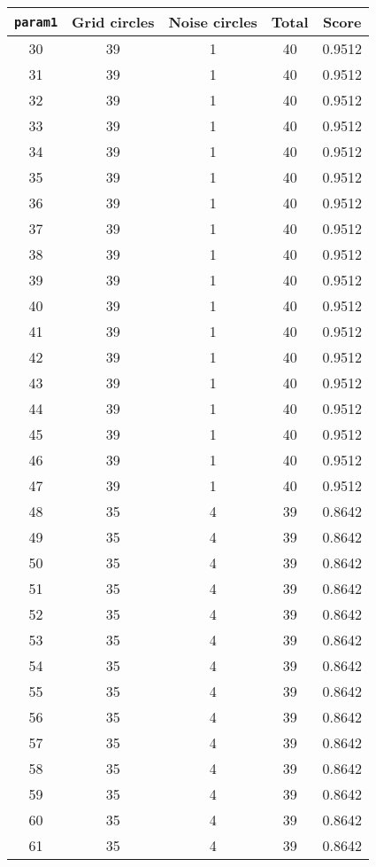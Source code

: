 \documentclass[letterpaper, 12pt]{article}
\begin{document}
\begin{longtable}{|c|c|c|c|c|}
\hline
\textbf{\texttt{param1}} & \textbf{Grid circles} & \textbf{Noise circles} & \textbf{Total} & \textbf{Score} \\
\hline
30 & 39 & 1 & 40 & 0.9512 \\
\hline
31 & 39 & 1 & 40 & 0.9512 \\
\hline
32 & 39 & 1 & 40 & 0.9512 \\
\hline
33 & 39 & 1 & 40 & 0.9512 \\
\hline
34 & 39 & 1 & 40 & 0.9512 \\
\hline
35 & 39 & 1 & 40 & 0.9512 \\
\hline
36 & 39 & 1 & 40 & 0.9512 \\
\hline
37 & 39 & 1 & 40 & 0.9512 \\
\hline
38 & 39 & 1 & 40 & 0.9512 \\
\hline
39 & 39 & 1 & 40 & 0.9512 \\
\hline
40 & 39 & 1 & 40 & 0.9512 \\
\hline
41 & 39 & 1 & 40 & 0.9512 \\
\hline
42 & 39 & 1 & 40 & 0.9512 \\
\hline
43 & 39 & 1 & 40 & 0.9512 \\
\hline
44 & 39 & 1 & 40 & 0.9512 \\
\hline
45 & 39 & 1 & 40 & 0.9512 \\
\hline
46 & 39 & 1 & 40 & 0.9512 \\
\hline
47 & 39 & 1 & 40 & 0.9512 \\
\hline
48 & 35 & 4 & 39 & 0.8642 \\
\hline
49 & 35 & 4 & 39 & 0.8642 \\
\hline
50 & 35 & 4 & 39 & 0.8642 \\
\hline
51 & 35 & 4 & 39 & 0.8642 \\
\hline
52 & 35 & 4 & 39 & 0.8642 \\
\hline
53 & 35 & 4 & 39 & 0.8642 \\
\hline
54 & 35 & 4 & 39 & 0.8642 \\
\hline
55 & 35 & 4 & 39 & 0.8642 \\
\hline
56 & 35 & 4 & 39 & 0.8642 \\
\hline
57 & 35 & 4 & 39 & 0.8642 \\
\hline
58 & 35 & 4 & 39 & 0.8642 \\
\hline
59 & 35 & 4 & 39 & 0.8642 \\
\hline
60 & 35 & 4 & 39 & 0.8642 \\
\hline
61 & 35 & 4 & 39 & 0.8642 \\

\end{longtable}
\end{document}
